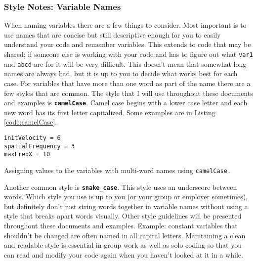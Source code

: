 \documentclass[oneside]{book}
\begin{document}
\subsubsection*{Style Notes: Variable Names}
When naming variables there are a few things to consider. Most important is to use names that are concise but still descriptive enough for you to easily understand your code and remember variables. This extends to code that may be shared; if someone else is working with your code and has to figure out what \texttt{var1} and \texttt{abcd} are for it will be very difficult. This doesn't mean that somewhat long names are always bad, but it is up to you to decide what works best for each case. For variables that have more than one word as part of the name there are a few styles that are common. The style that I will use throughout these documents and examples is \textbf{\texttt{camelCase}}. Camel case begins with a lower case letter and each new word has its first letter capitalized. Some examples are in Listing \ref{code:camelCase}.

\begin{listing}[htb]
\begin{mdframed}[backgroundcolor=codebg]
\begin{verbatim}
initVelocity = 6
spatialFrequency = 3
maxFreqX = 10
\end{verbatim}
\end{mdframed}
\caption{Assigning values to the variables with multi-word names using \texttt{camelCase.}}
\label{code:camelCase}
\end{listing}

Another common style is \textbf{\texttt{snake\_case}}. This style uses an underscore between words. Which style you use is up to you (or your group or employer sometimes), but definitely don't just string words together in variable names without using a style that breaks apart words visually. Other style guidelines will be presented throughout these documents and examples. Example: constant variables that shouldn't be changed are often named in all capital letters. Maintaining a clean and readable style is essential in group work as well as solo coding so that you can read and modify your code again when you haven't looked at it in a while.

\FloatBarrier
\end{document}
